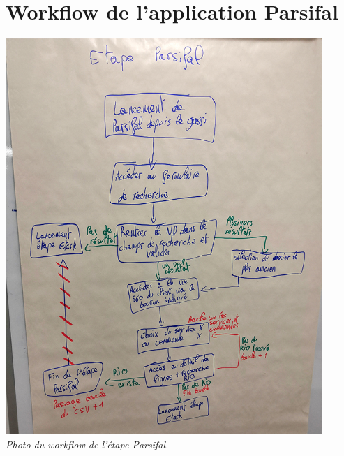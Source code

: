 \documentclass[a4paper,twoside,12pt,openright]{report}
\begin{document}
\chapter{Workflow de l'application Parsifal}
\begin{center}
\includegraphics[height=15cm]{workflowParsifal.jpg}\\
\itshape Photo du workflow de l'étape Parsifal.
\end{center}
\end{document}
